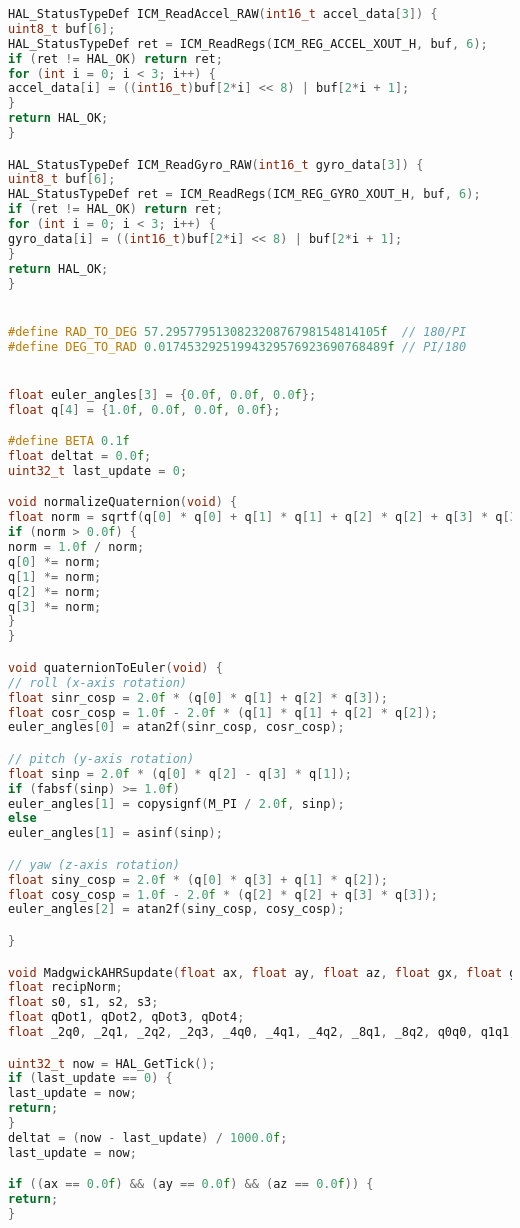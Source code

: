 \begin{lstlisting}[language=C++]
HAL_StatusTypeDef ICM_ReadAccel_RAW(int16_t accel_data[3]) {
uint8_t buf[6];
HAL_StatusTypeDef ret = ICM_ReadRegs(ICM_REG_ACCEL_XOUT_H, buf, 6);
if (ret != HAL_OK) return ret;
for (int i = 0; i < 3; i++) {
accel_data[i] = ((int16_t)buf[2*i] << 8) | buf[2*i + 1];
}
return HAL_OK;
}

HAL_StatusTypeDef ICM_ReadGyro_RAW(int16_t gyro_data[3]) {
uint8_t buf[6];
HAL_StatusTypeDef ret = ICM_ReadRegs(ICM_REG_GYRO_XOUT_H, buf, 6);
if (ret != HAL_OK) return ret;
for (int i = 0; i < 3; i++) {
gyro_data[i] = ((int16_t)buf[2*i] << 8) | buf[2*i + 1];
}
return HAL_OK;
}


#define RAD_TO_DEG 57.295779513082320876798154814105f  // 180/PI
#define DEG_TO_RAD 0.01745329251994329576923690768489f // PI/180


float euler_angles[3] = {0.0f, 0.0f, 0.0f}; 
float q[4] = {1.0f, 0.0f, 0.0f, 0.0f}; 

#define BETA 0.1f 
float deltat = 0.0f;
uint32_t last_update = 0;

void normalizeQuaternion(void) {
float norm = sqrtf(q[0] * q[0] + q[1] * q[1] + q[2] * q[2] + q[3] * q[3]);
if (norm > 0.0f) {
norm = 1.0f / norm;
q[0] *= norm;
q[1] *= norm;
q[2] *= norm;
q[3] *= norm;
}
}

void quaternionToEuler(void) {
// roll (x-axis rotation)
float sinr_cosp = 2.0f * (q[0] * q[1] + q[2] * q[3]);
float cosr_cosp = 1.0f - 2.0f * (q[1] * q[1] + q[2] * q[2]);
euler_angles[0] = atan2f(sinr_cosp, cosr_cosp);

// pitch (y-axis rotation)
float sinp = 2.0f * (q[0] * q[2] - q[3] * q[1]);
if (fabsf(sinp) >= 1.0f)
euler_angles[1] = copysignf(M_PI / 2.0f, sinp);
else
euler_angles[1] = asinf(sinp);

// yaw (z-axis rotation)
float siny_cosp = 2.0f * (q[0] * q[3] + q[1] * q[2]);
float cosy_cosp = 1.0f - 2.0f * (q[2] * q[2] + q[3] * q[3]);
euler_angles[2] = atan2f(siny_cosp, cosy_cosp);

}

void MadgwickAHRSupdate(float ax, float ay, float az, float gx, float gy, float gz) {
float recipNorm;
float s0, s1, s2, s3;
float qDot1, qDot2, qDot3, qDot4;
float _2q0, _2q1, _2q2, _2q3, _4q0, _4q1, _4q2, _8q1, _8q2, q0q0, q1q1, q2q2, q3q3;

uint32_t now = HAL_GetTick();
if (last_update == 0) {
last_update = now;
return;
}
deltat = (now - last_update) / 1000.0f;
last_update = now;

if ((ax == 0.0f) && (ay == 0.0f) && (az == 0.0f)) {
return;
}


\end{lstlisting}
